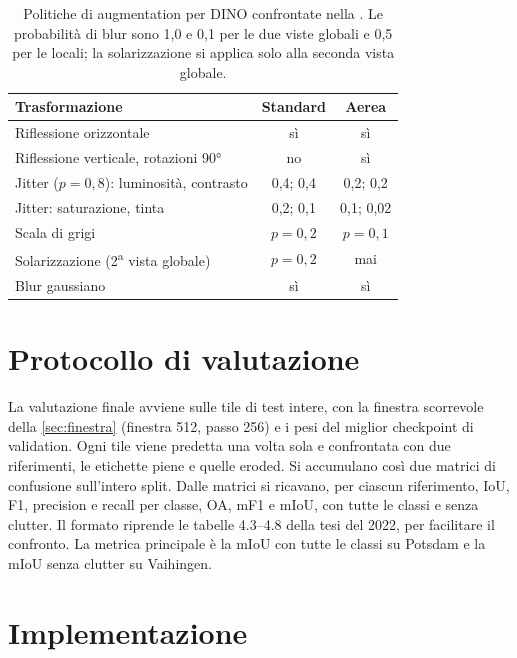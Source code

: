 \begin{table}[t]
  \centering
  \small
  \caption[Politiche di augmentation per DINO]{Politiche di augmentation per DINO confrontate
    nella . Le probabilità di blur sono 1,0 e 0,1 per le due viste globali e 0,5 per le
    locali; la solarizzazione si applica solo alla seconda vista globale.}
  \label{tab:augmentation-dino}
  \begin{tabular}{|l|c|c|}
    \hline
    \textbf{Trasformazione} & \textbf{Standard} & \textbf{Aerea} \\
    \hline
    Riflessione orizzontale & sì & sì \\
    Riflessione verticale, rotazioni \ang{90} & no & sì \\
    Jitter ($p=0{,}8$): luminosità, contrasto & 0,4; 0,4 & 0,2; 0,2 \\
    Jitter: saturazione, tinta & 0,2; 0,1 & 0,1; 0,02 \\
    Scala di grigi & $p=0{,}2$ & $p=0{,}1$ \\
    Solarizzazione (2\textsuperscript{a} vista globale) & $p=0{,}2$ & mai \\
    Blur gaussiano & sì & sì \\
    \hline
  \end{tabular}
\end{table}

\section{Protocollo di valutazione}
\label{sec:valutazione}

La valutazione finale avviene sulle tile di test intere, con la finestra scorrevole della
\cref{sec:finestra} (finestra 512, passo 256) e i pesi del miglior checkpoint di validation. Ogni
tile viene predetta una volta sola e confrontata con due riferimenti, le etichette piene e quelle
eroded. Si accumulano così due matrici di confusione sull'intero split. Dalle matrici si
ricavano, per ciascun riferimento, IoU, F1, precision e recall per classe, OA, mF1 e mIoU, con
tutte le classi e senza clutter. Il formato riprende le tabelle 4.3--4.8 della tesi del 2022, per
facilitare il confronto. La metrica principale è la mIoU con tutte le classi su Potsdam e la mIoU
senza clutter su Vaihingen.

\section{Implementazione}
\label{sec:implementazione}

